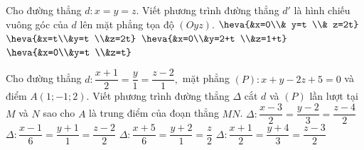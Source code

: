 \begin{ex}%
	Cho đường thẳng $d: x=y=z$. Viết phương trình đường thẳng $d'$ là hình chiếu vuông góc của $d$ lên mặt phẳng tọa độ $(Oyz)$. 
	\choice
	{$\heva{&x=0\\&	y=t \\&	z=2t}$}
	{$\heva{&x=t\\&y=t \\&z=2t}$}
	{$\heva{&x=0\\&y=2+t \\&z=1+t}$}
	{\True $\heva{&x=0\\&y=t \\&z=t}$}
	\loigiai{
	}
\end{ex}

\begin{ex}
	Cho đường thẳng $d:\dfrac{x+1}{2}=\dfrac{y}{1}=\dfrac{z-2}{1},$ mặt phẳng $(P):x+y-2z+5=0$ và điểm $A(1;-1;2).$ Viết phương trình đường thẳng $\Delta$ cắt $d$ và $(P)$ lần lượt tại $M$ và $N$ sao cho $A$ là trung điểm của đoạn thẳng $MN$.
	\choice
	{\True $\Delta:\dfrac{x-3}{2}=\dfrac{y-2}{3}=\dfrac{z-4}{2}$}
	{$\Delta:\dfrac{x-1}{6}=\dfrac{y+1}{1}=\dfrac{z-2}{2}$}
	{$\Delta:\dfrac{x+5}{6}=\dfrac{y+2}{1}=\dfrac{z}{2}$}
	{$\Delta:\dfrac{x+1}{2}=\dfrac{y+4}{3}=\dfrac{z-3}{2}$}
\end{ex}
